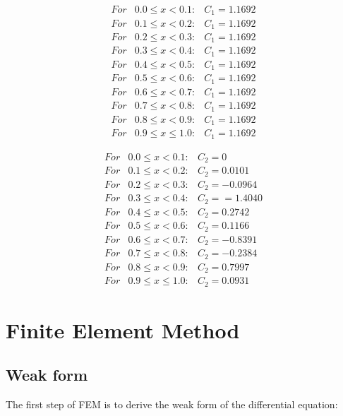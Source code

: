 \documentclass[paper=a4, fontsize=11pt]{article} %
\begin{document}
\begin{eqnarray}
For & 0.0 \leq x < 0.1 :& C_1 = 1.1692 \nonumber\\
For & 0.1 \leq x < 0.2 :& C_1 = 1.1692 \nonumber\\
For & 0.2 \leq x < 0.3 :& C_1 = 1.1692 \nonumber\\
For & 0.3 \leq x < 0.4 :& C_1 = 1.1692 \nonumber\\
For & 0.4 \leq x < 0.5 :& C_1 = 1.1692 \nonumber\\
For & 0.5 \leq x < 0.6 :& C_1 = 1.1692 \nonumber\\
For & 0.6 \leq x < 0.7 :& C_1 = 1.1692 \nonumber\\
For & 0.7 \leq x < 0.8 :& C_1 = 1.1692 \nonumber\\
For & 0.8 \leq x < 0.9 :& C_1 = 1.1692\nonumber\\
For & 0.9 \leq x \leq 1.0 :& C_1 = 1.1692
\end{eqnarray}


\begin{eqnarray}
For & 0.0 \leq x < 0.1 :& C_2 = 0 \nonumber\\
For & 0.1 \leq x < 0.2 :& C_2 = 0.0101\nonumber\\
For & 0.2 \leq x < 0.3 :& C_2 = -0.0964 \nonumber\\
For & 0.3 \leq x < 0.4 :& C_2 = =1.4040 \nonumber\\
For & 0.4 \leq x < 0.5 :& C_2 = 0.2742 \nonumber\\
For & 0.5 \leq x < 0.6 :& C_2 = 0.1166 \nonumber\\
For & 0.6 \leq x < 0.7 :& C_2 = -0.8391 \nonumber\\
For & 0.7 \leq x < 0.8 :& C_2 = -0.2384 \nonumber\\
For & 0.8 \leq x < 0.9 :& C_2 = 0.7997\nonumber\\
For & 0.9 \leq x \leq 1.0 :& C_2 = 0.0931
\end{eqnarray}

\section{Finite Element Method}

\subsection{Weak form
}
The first step of FEM is to derive the weak form of the differential equation:
\end{document}
